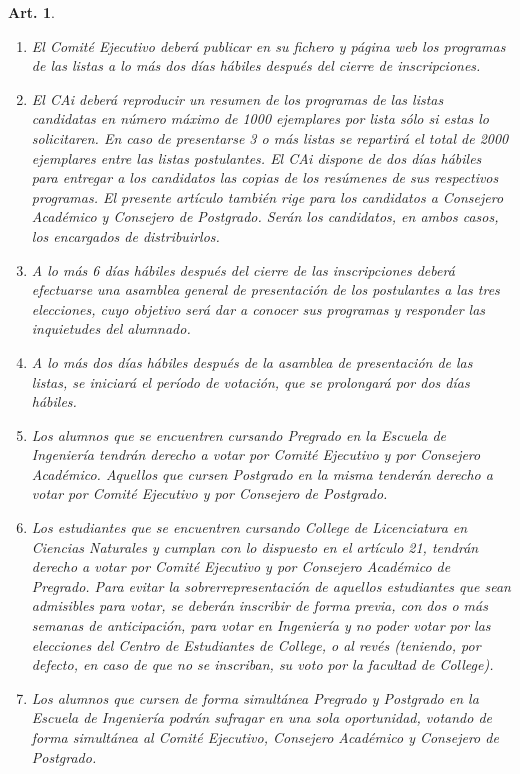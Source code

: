 \documentclass[letterpaper,11pt]{article}
\theoremstyle{plain}
\newtheorem{art}{Art.} %
\begin{document}
\begin{art}
\begin{enumerate}
				\item El Comité Ejecutivo deberá publicar en su fichero y página web los programas de las listas a lo más dos días hábiles después del cierre de inscripciones.
				
				\item El CAi deberá reproducir un resumen de los programas de las listas candidatas en número máximo de 1000 ejemplares por lista sólo si estas lo solicitaren. En caso de presentarse 3 o más listas se repartirá el total de 2000 ejemplares entre las listas postulantes. El CAi dispone de dos días hábiles para entregar a los candidatos las copias de los resúmenes de sus respectivos programas. El presente artículo también rige para los candidatos a Consejero Académico y Consejero de Postgrado. Serán los candidatos, en ambos casos, los encargados de distribuirlos.
				
				\item A lo más 6 días hábiles después del cierre de las inscripciones deberá efectuarse una asamblea general de presentación de los postulantes a las tres elecciones, cuyo objetivo será dar a conocer sus programas y responder las inquietudes del alumnado.
				
				\item \label{periodo}A lo más dos días hábiles después de la asamblea de presentación de las listas, se iniciará el período de votación, que se prolongará por dos días hábiles.
				
				\item \label{votantes}Los alumnos que se encuentren cursando Pregrado en la Escuela de Ingeniería tendrán derecho a votar por Comité Ejecutivo y por Consejero Académico. Aquellos que cursen Postgrado en la misma tenderán derecho a votar por Comité Ejecutivo y por Consejero de Postgrado.

				\item \label{votantesCollege} Los estudiantes que se encuentren cursando College de Licenciatura en Ciencias Naturales y cumplan con lo dispuesto en el artículo 21, tendrán derecho a votar por Comité Ejecutivo y por Consejero Académico de Pregrado. Para evitar la sobrerrepresentación de aquellos estudiantes que sean admisibles para votar, se deberán inscribir de forma previa, con dos o más semanas de anticipación, para votar en Ingeniería y no poder votar por las elecciones del Centro de Estudiantes de College, o al revés (teniendo, por defecto, en caso de que no se inscriban, su voto por la facultad de College).
				
				\item Los alumnos que cursen de forma simultánea Pregrado y Postgrado en la Escuela de Ingeniería podrán sufragar en una sola oportunidad, votando de forma simultánea al Comité Ejecutivo, Consejero Académico y Consejero de Postgrado.
				

\end{enumerate}
\end{art}
\end{document}
